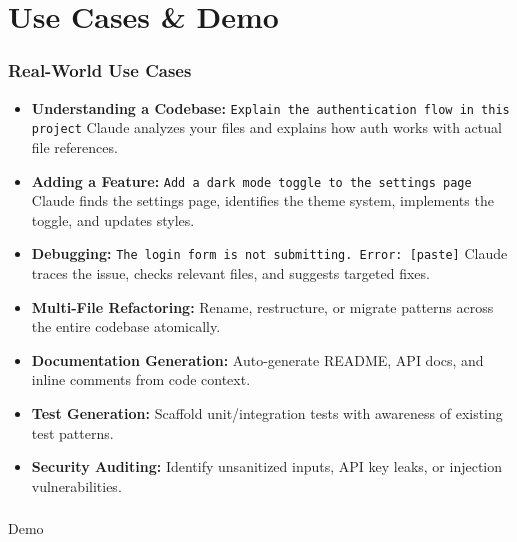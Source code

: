 \section{Use Cases \& Demo}
\begin{frame}[fragile]\frametitle{Real-World Use Cases}
  \begin{itemize}
    \item \textbf{Understanding a Codebase:}
    \lstinline|Explain the authentication flow in this project|
    Claude analyzes your files and explains how auth works with actual file references.

    \item \textbf{Adding a Feature:}
    \lstinline|Add a dark mode toggle to the settings page|
    Claude finds the settings page, identifies the theme system, implements the toggle, and updates styles.

    \item \textbf{Debugging:}
    \lstinline|The login form is not submitting. Error: [paste]|
    Claude traces the issue, checks relevant files, and suggests targeted fixes.

    \item \textbf{Multi-File Refactoring:} Rename, restructure, or migrate patterns across the entire codebase atomically.
    \item \textbf{Documentation Generation:} Auto-generate README, API docs, and inline comments from code context.
    \item \textbf{Test Generation:} Scaffold unit/integration tests with awareness of existing test patterns.
    \item \textbf{Security Auditing:} Identify unsanitized inputs, API key leaks, or injection vulnerabilities.
  \end{itemize}
\end{frame}


\begin{frame}[fragile]\frametitle{}

\begin{center}
{\Large Demo}
\end{center}
\end{frame}


